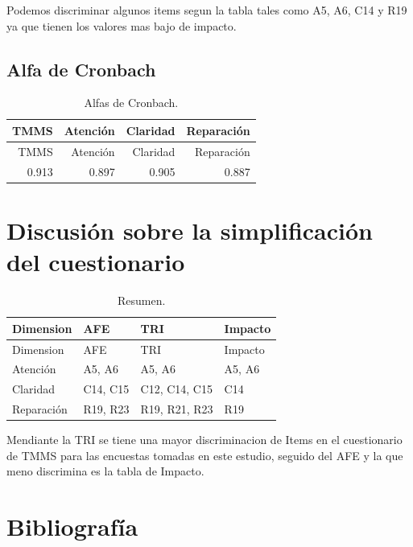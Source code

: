\documentclass[
  10pt,
  spanish,
]{article}
\begin{document}
Podemos discriminar algunos items segun la tabla tales como A5, A6, C14
y R19 ya que tienen los valores mas bajo de impacto.

\hypertarget{alfa-de-cronbach}{%
\subsection{Alfa de Cronbach}\label{alfa-de-cronbach}}

\begin{longtable}[]{@{}rrrr@{}}
\caption{Alfas de Cronbach.\label{tab:tab_cron}}\tabularnewline
\toprule
TMMS & Atención & Claridad & Reparación\tabularnewline
\midrule
\endfirsthead
\toprule
TMMS & Atención & Claridad & Reparación\tabularnewline
\midrule
\endhead
0.913 & 0.897 & 0.905 & 0.887\tabularnewline
\bottomrule
\end{longtable}

\hypertarget{discusiuxf3n-sobre-la-simplificaciuxf3n-del-cuestionario}{%
\section{Discusión sobre la simplificación del
cuestionario}\label{discusiuxf3n-sobre-la-simplificaciuxf3n-del-cuestionario}}

\begin{longtable}[]{@{}llll@{}}
\caption{Resumen.\label{tab:tab_discr}}\tabularnewline
\toprule
Dimension & AFE & TRI & Impacto\tabularnewline
\midrule
\endfirsthead
\toprule
Dimension & AFE & TRI & Impacto\tabularnewline
\midrule
\endhead
Atención & A5, A6 & A5, A6 & A5, A6\tabularnewline
Claridad & C14, C15 & C12, C14, C15 & C14\tabularnewline
Reparación & R19, R23 & R19, R21, R23 & R19\tabularnewline
\bottomrule
\end{longtable}

Mendiante la TRI se tiene una mayor discriminacion de Items en el
cuestionario de TMMS para las encuestas tomadas en este estudio, seguido
del AFE y la que meno discrimina es la tabla de Impacto.

\hypertarget{bibliografuxeda}{%
\section{Bibliografía}\label{bibliografuxeda}}
\end{document}
